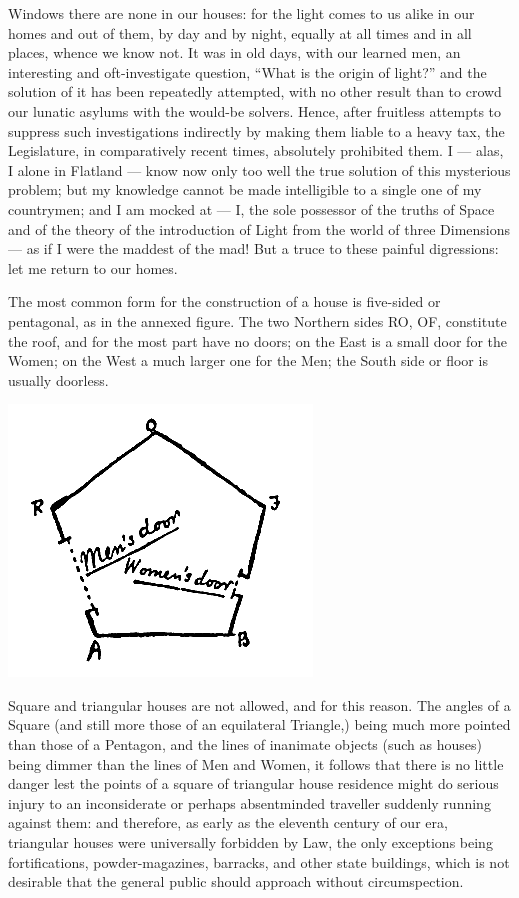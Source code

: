 \documentclass[12pt, a4paper, twoside]{memoir}
\begin{document}
Windows there are none in our houses: for the light comes to us alike in our
homes and out of them, by day and by night, equally at all times and in all
places, whence we know not. It was in old days, with our learned men, an
interesting and oft-investigate question, ``What is the origin of light?'' and
the solution of it has been repeatedly attempted, with no other result than to
crowd our lunatic asylums with the would-be solvers. Hence, after fruitless
attempts to suppress such investigations indirectly by making them liable to a
heavy tax, the Legislature, in comparatively recent times, absolutely
prohibited them. I --- alas, I alone in Flatland --- know now only too well the
true solution of this mysterious problem; but my knowledge cannot be made
intelligible to a single one of my countrymen; and I am mocked at --- I, the
sole possessor of the truths of Space and of the theory of the introduction of
Light from the world of three Dimensions --- as if I were the maddest of the
mad! But a truce to these painful digressions: let me return to our homes.

The most common form for the construction of a house is five-sided or
pentagonal, as in the annexed figure. The two Northern sides RO, OF,
constitute the roof, and for the most part have no doors; on the East is a
small door for the Women; on the West a much larger one for the Men; the South
side or floor is usually doorless.
\begin{center}
\includegraphics[trim=20mm 0mm 0mm 0mm, scale=0.5]{fig2}
\end{center}


Square and triangular houses are not allowed, and for this reason. The angles
of a Square (and still more those of an equilateral Triangle,) being much more
pointed than those of a Pentagon, and the lines of inanimate objects (such as
houses) being dimmer than the lines of Men and Women, it follows that there is
no little danger lest the points of a square of triangular house residence
might do serious injury to an inconsiderate or perhaps absentminded traveller
suddenly running against them: and therefore, as early as the eleventh century
of our era, triangular houses were universally forbidden by Law, the only
exceptions being fortifications, powder-magazines, barracks, and other state
buildings, which is not desirable that the general public should approach
without circumspection.
\end{document}

